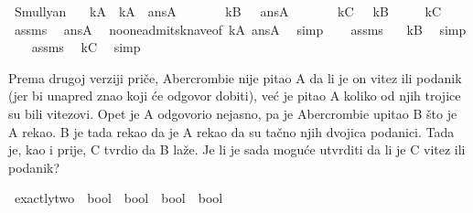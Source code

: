 \begin{isabellebody}
\begin{exercise}[subtitle=Logčki lavirinti.]
\begin{isamarkuptext}
\end{isamarkuptext}\isamarkuptrue%
\isamarkupfalse%
\ Smullyan{\isacharunderscore}{\kern0pt}{}{\isacharunderscore}{\kern0pt}{}{\isacharcolon}{\kern0pt}\isanewline
\ \ \ {\isachardoublequoteopen}kA\ {\isasymlongleftrightarrow}\ {\isacharparenleft}{\kern0pt}kA\ {\isasymlongleftrightarrow}\ ansA{\isacharparenright}{\kern0pt}{\isachardoublequoteclose}\isanewline
\ \ \ \ \ \ \ {\isachardoublequoteopen}kB\ {\isasymlongleftrightarrow}\ {\isasymnot}\ ansA{\isachardoublequoteclose}\isanewline
\ \ \ \ \ \ \ {\isachardoublequoteopen}kC\ {\isasymlongleftrightarrow}\ {\isasymnot}\ kB{\isachardoublequoteclose}\isanewline
\ \ \ \ \ kC\isanewline
%
\isadelimproof
%
\endisadelimproof
%
\isatagproof
{}\isamarkupfalse%
\ {\isacharminus}{\kern0pt}\isanewline
\ \ \isamarkupfalse%
\ assms{\isacharparenleft}{\kern0pt}{}{\isacharparenright}{\kern0pt}\ \isamarkupfalse%
\ ansA\ \isamarkupfalse%
\ no{\isacharunderscore}{\kern0pt}one{\isacharunderscore}{\kern0pt}admits{\isacharunderscore}{\kern0pt}knave{\isacharbrackleft}{\kern0pt}of\ kA\ ansA{\isacharbrackright}{\kern0pt}\ \isamarkupfalse%
\ simp\isanewline
\ \ \isamarkupfalse%
\ assms{\isacharparenleft}{\kern0pt}{}{\isacharparenright}{\kern0pt}\ \isamarkupfalse%
\ {\isachardoublequoteopen}{\isasymnot}\ kB{\isachardoublequoteclose}\ \isamarkupfalse%
\ simp\isanewline
\ \ \isamarkupfalse%
\ assms{\isacharparenleft}{\kern0pt}{}{\isacharparenright}{\kern0pt}\ \isamarkupfalse%
\ kC\ \isamarkupfalse%
\ simp\isanewline
{}\isamarkupfalse%
%
\endisatagproof
{\isafoldproof}%
%
\isadelimproof
%
\endisadelimproof
%
\begin{isamarkuptext}%
Prema drugoj verziji priče, 
      Abercrombie nije pitao A da li je on vitez ili podanik 
      (jer bi unapred znao koji će odgovor dobiti), 
      već je pitao A koliko od njih trojice su bili vitezovi. 
      Opet je A odgovorio nejasno, pa je Abercrombie upitao B što je A rekao. 
      B je tada rekao da je A rekao da su tačno njih dvojica podanici. 
      Tada je, kao i prije, C tvrdio da B laže. 
      Je li je sada moguće utvrditi da li je C vitez ili podanik?%
\end{isamarkuptext}\isamarkuptrue%
\isamarkupfalse%
\ exactly{\isacharunderscore}{\kern0pt}two\ {\isacharcolon}{\kern0pt}{\isacharcolon}{\kern0pt}\ {\isachardoublequoteopen}bool\ {\isasymRightarrow}\ bool\ {\isasymRightarrow}\ bool\ {\isasymRightarrow}\ bool{\isachardoublequoteclose}\ \isanewline

\end{exercise}
\end{isabellebody}
